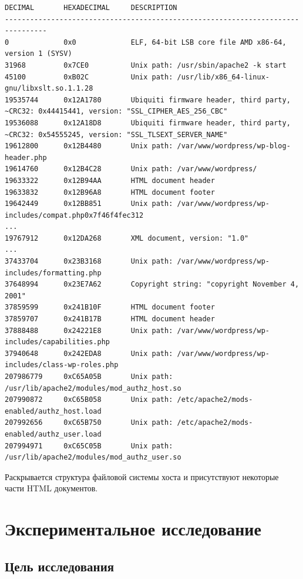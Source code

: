 \documentclass[20pt]{article}
\begin{document}
\begin{lstlisting}[caption={Пример работы binwalk на дампе памяти},label={binwalk-example},breaklines]
DECIMAL       HEXADECIMAL     DESCRIPTION
--------------------------------------------------------------------------------
0             0x0             ELF, 64-bit LSB core file AMD x86-64, version 1 (SYSV)
31968         0x7CE0          Unix path: /usr/sbin/apache2 -k start
45100         0xB02C          Unix path: /usr/lib/x86_64-linux-gnu/libxslt.so.1.1.28
19535744      0x12A1780       Ubiquiti firmware header, third party, ~CRC32: 0x44415441, version: "SSL_CIPHER_AES_256_CBC"
19536088      0x12A18D8       Ubiquiti firmware header, third party, ~CRC32: 0x54555245, version: "SSL_TLSEXT_SERVER_NAME"
19612800      0x12B4480       Unix path: /var/www/wordpress/wp-blog-header.php
19614760      0x12B4C28       Unix path: /var/www/wordpress/
19633322      0x12B94AA       HTML document header
19633832      0x12B96A8       HTML document footer
19642449      0x12BB851       Unix path: /var/www/wordpress/wp-includes/compat.php0x7f46f4fec312
...
19767912      0x12DA268       XML document, version: "1.0"
...
37433704      0x23B3168       Unix path: /var/www/wordpress/wp-includes/formatting.php
37648994      0x23E7A62       Copyright string: "copyright November 4, 2001"
37859599      0x241B10F       HTML document footer
37859707      0x241B17B       HTML document header
37888488      0x24221E8       Unix path: /var/www/wordpress/wp-includes/capabilities.php
37940648      0x242EDA8       Unix path: /var/www/wordpress/wp-includes/class-wp-roles.php
207986779     0xC65A05B       Unix path: /usr/lib/apache2/modules/mod_authz_host.so
207990872     0xC65B058       Unix path: /etc/apache2/mods-enabled/authz_host.load
207992656     0xC65B750       Unix path: /etc/apache2/mods-enabled/authz_user.load
207994971     0xC65C05B       Unix path: /usr/lib/apache2/modules/mod_authz_user.so
\end{lstlisting}

Раскрывается структура файловой системы хоста и присутствуют некоторые части
HTML документов.

\newpage

\section{Экспериментальное исследование}

\subsection{Цель исследования}
\end{document}
